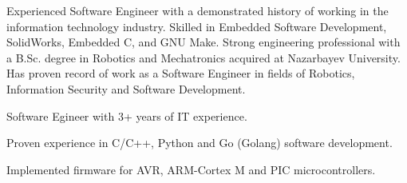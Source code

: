 
\begin{cvparagraph}
Experienced Software Engineer with a demonstrated history of working in the information technology 
industry. Skilled in Embedded Software Development, SolidWorks, Embedded C, and GNU Make. Strong 
engineering professional with a B.Sc. degree in Robotics and Mechatronics acquired at 
Nazarbayev University.
Has proven record of work as a Software Engineer in fields of Robotics, Information Security and  Software Development. 
\newline
\begin{cvitems}
    \item {Software Egineer with 3+ years of IT experience.}
    \item {Proven experience in C/C++, Python and Go (Golang) software development.}
    \item {Implemented firmware for AVR, ARM-Cortex M and PIC microcontrollers.}
\end{cvitems}

\end{cvparagraph}